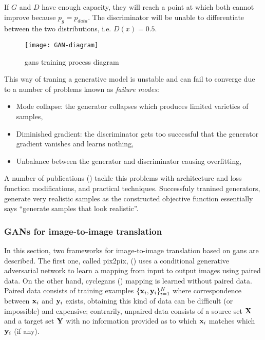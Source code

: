 \documentclass[../main.tex]{subfiles}
\begin{document}
If $G$ and $D$ have enough capacity, they will reach a point at which both cannot
improve because $p_g = p_{data}$.
The discriminator will be unable to differentiate between the two distributions,
i.e. $D(x) = 0.5$.

\begin{figure}[H]
\centering
\texttt{[image: GAN-diagram]}
\caption{\gls{gans} training process diagram}
\label{fig:gan-diagram}
\end{figure}

This way of traning a generative model is unstable and can fail to converge due
to a number of problems known as \emph{failure modes}:
\begin{itemize}
  \item Mode collapse: the generator collapses which produces limited varieties
  of samples,
  \item Diminished gradient: the discriminator gets too successful that the
  generator gradient vanishes and learns nothing,
  \item Unbalance between the generator and discriminator causing overfitting,
\end{itemize}

A number of publications
(\cite{Arjovsky2017,miyato2018spectral,DBLP:journals/corr/SalimansGZCRC16})
tackle this problems with architecture and loss function modifications, and
practical techniques.
Successfuly tranined generators, generate
very realistic samples as the constructed objective function essentially says
``generate samples that look realistic''.

\subsubsection{GANs for image-to-image translation}
\label{sec:gans-translation}

In this section, two frameworks for image-to-image translation based on \gls{gans}
are described. The first one, called pix2pix, (\cite{Isola2016}) uses a
conditional generative adversarial network to learn a mapping from input to
output images using paired data.
On the other hand, \gls{cyclegans} (\cite{Zhu2017a}) mapping is learned
without paired data.
Paired data consists of training examples
$\{\mathbf{x}_i, \mathbf{y}_i\}_{i=1}^N$
where correspondence between $\mathbf{x}_i$ and $\mathbf{y}_i$ exists, obtaining
this kind of data can be difficult (or impossible) and expensive; contrarily,
unpaired data consists of a source set $\mathbf{X}$ and a target set $\mathbf{Y}$
with no information provided as to which $\mathbf{x}_i$ matches which
$\mathbf{y}_i$ (if any).
\end{document}
